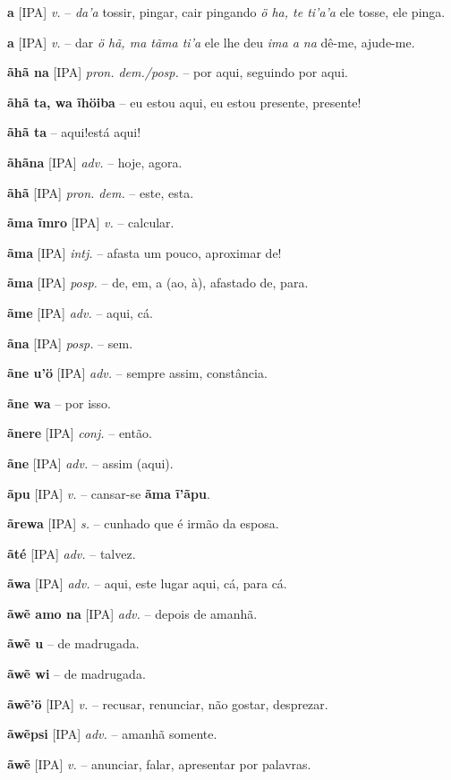 \textbf{a} [IPA] \textit{v.} -- \textit{da'a} tossir, pingar, cair pingando  \textit{ö ha, te ti'a'a} ele tosse, ele pinga.

\textbf{a} [IPA] \textit{v.} -- dar  \textit{ö hã, ma tãma ti'a} ele lhe deu  \textit{ima a na} dê-me, ajude-me.

\textbf{ãhã na} [IPA] \textit{pron. dem./posp.} -- por aqui, seguindo por aqui.

\textbf{ãhã ta, wa ĩhöiba} -- eu estou aqui, eu estou presente, presente!

\textbf{ãhã ta} -- aqui!está aqui!

\textbf{ãhãna} [IPA] \textit{adv.} -- hoje, agora.

\textbf{ãhã} [IPA] \textit{pron. dem.} -- este, esta.

\textbf{ãma ĩmro} [IPA] \textit{v.} -- calcular.

\textbf{ãma} [IPA] \textit{intj.} -- afasta um pouco, aproximar de!

\textbf{ãma} [IPA] \textit{posp.} -- de, em, a (ao, à), afastado de, para.

\textbf{ãme} [IPA] \textit{adv.} -- aqui, cá.

\textbf{ãna} [IPA] \textit{posp.} -- sem.

\textbf{ãne u'ö} [IPA] \textit{adv.} -- sempre assim, constância.

\textbf{ãne wa} -- por isso.

\textbf{ãnere} [IPA] \textit{conj.} -- então.

\textbf{ãne} [IPA] \textit{adv.} -- assim (aqui).

\textbf{ãpu} [IPA] \textit{v.} -- cansar-se  \textbf{ãma ĩ'ãpu}.

\textbf{ãrewa} [IPA] \textit{s.} -- cunhado que é irmão da esposa.

\textbf{ãté} [IPA] \textit{adv.} -- talvez.

\textbf{ãwa} [IPA] \textit{adv.} -- aqui, este lugar aqui, cá, para cá.

\textbf{ãwẽ amo na} [IPA] \textit{adv.} -- depois de amanhã.

\textbf{ãwẽ u} -- de madrugada.

\textbf{ãwẽ wi} -- de madrugada.

\textbf{ãwẽ'ö} [IPA] \textit{v.} -- recusar, renunciar, não gostar, desprezar.

\textbf{ãwẽpsi} [IPA] \textit{adv.} -- amanhã somente.

\textbf{ãwẽ} [IPA] \textit{v.} -- anunciar, falar, apresentar por palavras.

